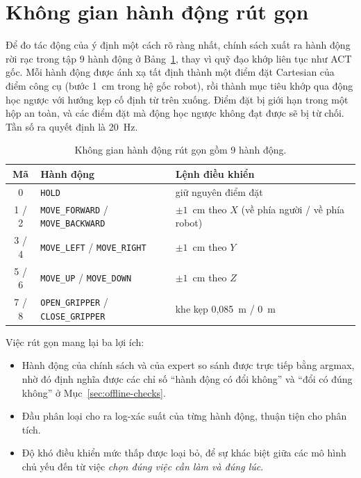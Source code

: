 \section{Không gian hành động rút gọn}
\label{sec:action-space}

Để đo tác động của ý định một cách rõ ràng nhất, chính sách xuất ra hành động rời rạc trong tập 9 hành động ở Bảng~\ref{tab:actions}, thay vì quỹ đạo khớp liên tục như ACT gốc. Mỗi hành động được ánh xạ tất định thành một điểm đặt Cartesian của điểm công cụ (bước 1~cm trong hệ gốc robot), rồi thành mục tiêu khớp qua động học ngược với hướng kẹp cố định từ trên xuống. Điểm đặt bị giới hạn trong một hộp an toàn, và các điểm đặt mà động học ngược không đạt được sẽ bị từ chối. Tần số ra quyết định là 20~Hz.

\begin{table}[htbp]
  \centering
  \caption{Không gian hành động rút gọn gồm 9 hành động.}
  \label{tab:actions}
  \small
  \begin{tabular}{@{}cll@{}}
    \toprule
    \textbf{Mã} & \textbf{Hành động} & \textbf{Lệnh điều khiển} \\
    \midrule
    0 & \texttt{HOLD} & giữ nguyên điểm đặt \\
    1 / 2 & \texttt{MOVE\_FORWARD} / \texttt{MOVE\_BACKWARD} & $\pm 1$~cm theo $X$ (về phía người / về phía robot) \\
    3 / 4 & \texttt{MOVE\_LEFT} / \texttt{MOVE\_RIGHT} & $\pm 1$~cm theo $Y$ \\
    5 / 6 & \texttt{MOVE\_UP} / \texttt{MOVE\_DOWN} & $\pm 1$~cm theo $Z$ \\
    7 / 8 & \texttt{OPEN\_GRIPPER} / \texttt{CLOSE\_GRIPPER} & khe kẹp 0,085~m / 0~m \\
    \bottomrule
  \end{tabular}
\end{table}

Việc rút gọn mang lại ba lợi ích:
\begin{itemize}
  \item Hành động của chính sách và của expert so sánh được trực tiếp bằng argmax, nhờ đó định nghĩa được các chỉ số ``hành động có đổi không'' và ``đổi có đúng không'' ở Mục~\ref{sec:offline-checks}.
  \item Đầu phân loại cho ra log-xác suất của từng hành động, thuận tiện cho phân tích.
  \item Độ khó điều khiển mức thấp được loại bỏ, để sự khác biệt giữa các mô hình chủ yếu đến từ việc \emph{chọn đúng việc cần làm và đúng lúc}.
\end{itemize}

